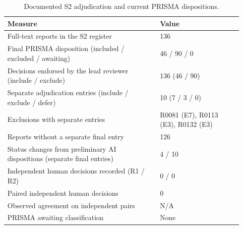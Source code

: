 \begin{table}[htbp]
\centering
\caption{Documented S2 adjudication and current PRISMA dispositions.}
\label{tab:adjudication_audit}
\begin{tabular}{@{}p{0.61\linewidth}p{0.33\linewidth}@{}}
\hline
\textbf{Measure} & \textbf{Value} \\
\hline
Full-text reports in the S2 register & 136 \\
Final PRISMA disposition (included / excluded / awaiting) & 46 / 90 / 0 \\
Decisions endorsed by the lead reviewer (include / exclude) & 136 (46 / 90) \\
Separate adjudication entries (include / exclude / defer) & 10 (7 / 3 / 0) \\
Exclusions with separate entries & R0081 (E7), R0113 (E3), R0132 (E3) \\
Reports without a separate final entry & 126 \\
Status changes from preliminary AI dispositions (separate final entries) & 4 / 10 \\
Independent human decisions recorded (R1 / R2) & 0 / 0 \\
Paired independent human decisions & 0 \\
Observed agreement on independent pairs & N/A \\
PRISMA awaiting classification & None \\
\hline
\end{tabular}
\end{table}
